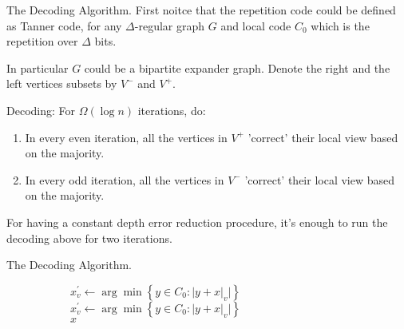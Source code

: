 \documentclass{beamer}
\begin{document}
\begin{frame}{The Decoding Algorithm.}
  First noitce that the repetition code could be defined as Tanner code, for any $\Delta$-regular graph $G$ and local code $C_{0}$ which is the repetition over $\Delta$ bits.   


  In particular $G$ could be a bipartite expander graph. Denote the right and the left vertices subsets by $V^{-}$ and $V^{+}$.
  \begin{block}{Decoding:}
    For $\Omega\left( \log n \right)$ iterations, do: 
  \begin{enumerate}
    \item In every even iteration, all the vertices in $V^{+}$ 'correct' their local view based on the majority.
    \item In every odd iteration, all the vertices in $V^{-}$ 'correct' their local view based on the majority.
  \end{enumerate}
For having a constant depth error reduction procedure, it's enough to run the decoding above for two iterations.
\end{block}

\end{frame}


\begin{frame}{The Decoding Algorithm.}

  
  \begin{figure}[h]
    \begin{subfigure}[h]{0.4\textwidth}

    \label{alg:three}
      \begin{algorithm}[H]
     {
      $x^{\prime}_{v} \leftarrow \arg\min {\left\{  y \in C_{0} : |y + x|_{v} |  \right\} } $\\
    }
     {
      $x^{\prime}_{v} \leftarrow \arg\min {\left\{  y \in C_{0} : |y + x|_{v} |  \right\} } $\\
    }
    \Return  $x $

  \end{algorithm}
    \end{subfigure}
    \begin{subfigure}[h]{0.1\textwidth}
      \
    \end{subfigure}
    \begin{subfigure}[h]{0.45\textwidth} 

    \label{fig:location}
    \end{subfigure} 
  \end{figure}

\end{frame}
\end{document}
